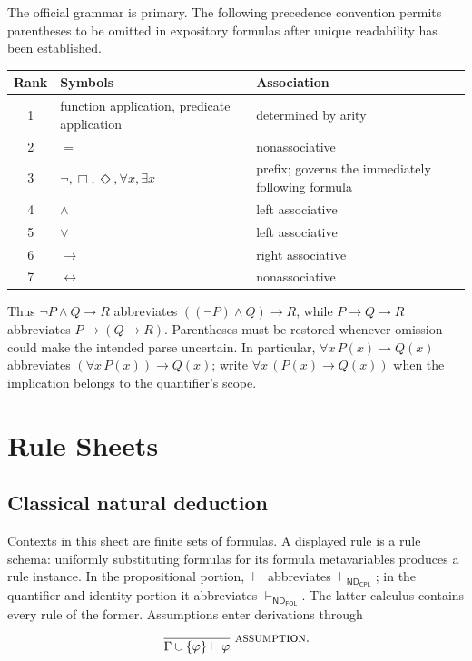 \documentclass[11pt,oneside,openany]{book}
\theoremstyle{definition}
\theoremstyle{plain}
\theoremstyle{remark}
\DeclarePairedDelimiter{\set}{\lbrace}{\rbrace}
\newcommand{\derives}{\vdash}
\newcommand{\ND}{\mathsf{ND}}
\newcommand{\CPL}{\mathsf{CPL}}
\newcommand{\FOL}{\mathsf{FOL}}
\newcommand{\Rule}[3][]{\frac{#2}{#3}\;\textsc{#1}}
\begin{document}
The official grammar is primary.  The following precedence convention permits
parentheses to be omitted in expository formulas after unique readability has
been established.

\begin{center}
\begin{tabularx}{\textwidth}{@{}c>{\raggedright\arraybackslash}p{}>{\raggedright\arraybackslash}X@{}}
\toprule
Rank & Symbols & Association \\
\midrule
1 & function application, predicate application & determined by arity \\
2 & \(=\) & nonassociative \\
3 & \(\neg,\Box,\Diamond,\forall x,\exists x\) & prefix; governs the immediately following formula \\
4 & \(\land\) & left associative \\
5 & \(\lor\) & left associative \\
6 & \(\to\) & right associative \\
7 & \(\leftrightarrow\) & nonassociative \\
\bottomrule
\end{tabularx}
\end{center}

Thus \(\neg P\land Q\to R\) abbreviates
\(((\neg P)\land Q)\to R\), while
\(P\to Q\to R\) abbreviates \(P\to(Q\to R)\).  Parentheses must be restored
whenever omission could make the intended parse uncertain.  In particular,
\(\forall x\,P(x)\to Q(x)\) abbreviates
\((\forall x\,P(x))\to Q(x)\); write
\(\forall x\,(P(x)\to Q(x))\) when the implication belongs to the
quantifier's scope.

\chapter{Rule Sheets}
\label{ch:rule-sheets}
\label{app:rules}

\section{Classical natural deduction}
\label{sec:rule-sheets-01}

Contexts in this sheet are finite sets of formulas.  A displayed rule is a rule
schema: uniformly substituting formulas for its formula metavariables produces
a rule instance.  In the propositional portion, \(\derives\) abbreviates
\(\derives_{\ND_{\CPL}}\); in the quantifier and identity portion it
abbreviates \(\derives_{\ND_{\FOL}}\).  The latter calculus contains every
rule of the former.  Assumptions enter derivations through
\[
\Rule[assumption]{}{\Gamma\cup\set{\varphi}\derives\varphi}.
\]
\end{document}
